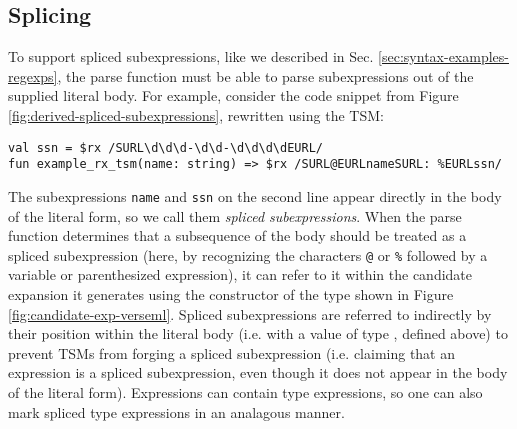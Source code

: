 

\subsection{Splicing}\label{sec:splicing-and-hygiene}
To support spliced subexpressions, like we described in Sec. \ref{sec:syntax-examples-regexps}, the parse function must be able to parse subexpressions out of the supplied literal body. For example, consider the code snippet from Figure \ref{fig:derived-spliced-subexpressions}, rewritten using the  TSM:
\begin{lstlisting}[numbers=none]
val ssn = $rx /SURL\d\d\d-\d\d-\d\d\d\dEURL/
fun example_rx_tsm(name: string) => $rx /SURL@EURLnameSURL: %EURLssn/
\end{lstlisting}
The subexpressions \lstinline{name} and \lstinline{ssn} on the second line appear directly in the body of the literal form, so we call them \emph{spliced subexpressions}. When the parse function determines that a subsequence of the body should be treated as a spliced subexpression (here, by recognizing the characters \lstinline{@} or \lstinline{%} followed by a variable or parenthesized expression), 
it can refer to it within the candidate expansion it generates using the  constructor of the  type shown in Figure \ref{fig:candidate-exp-verseml}. Spliced subexpressions are referred to indirectly by their position within the literal body (i.e. with a value of type , defined above) to prevent TSMs from forging a spliced subexpression (i.e. claiming that an expression is a spliced subexpression, even though it does not appear in the body of the literal form). Expressions can contain type expressions, so one can also mark spliced type expressions in an analagous manner. %

